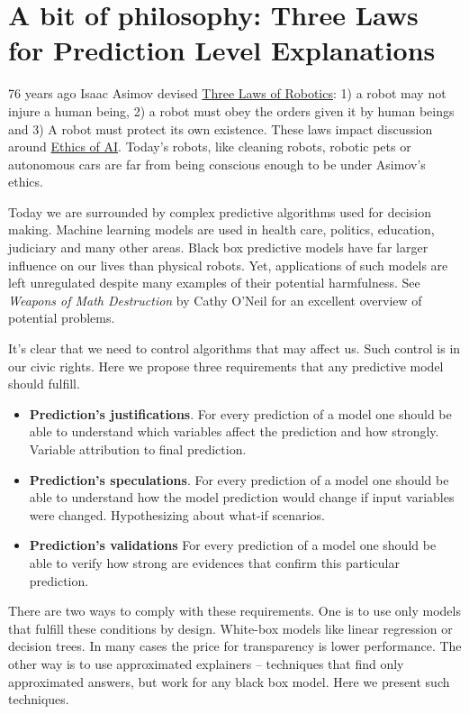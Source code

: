 \documentclass[]{book}
\providecommand{\tightlist}{%
  \setlength{\itemsep}{0pt}\setlength{\parskip}{0pt}}
\theoremstyle{definition}
\theoremstyle{definition}
\theoremstyle{definition}
\theoremstyle{remark}
\begin{document}
\hypertarget{three-single-laws}{%
\section{A bit of philosophy: Three Laws for Prediction Level
Explanations}\label{three-single-laws}}

76 years ago Isaac Asimov devised
\href{https://en.wikipedia.org/wiki/Three_Laws_of_Robotics}{Three Laws
of Robotics}: 1) a robot may not injure a human being, 2) a robot must
obey the orders given it by human beings and 3) A robot must protect its
own existence. These laws impact discussion around
\href{https://en.wikipedia.org/wiki/Ethics_of_artificial_intelligence}{Ethics
of AI}. Today's robots, like cleaning robots, robotic pets or autonomous
cars are far from being conscious enough to be under Asimov's ethics.

Today we are surrounded by complex predictive algorithms used for
decision making. Machine learning models are used in health care,
politics, education, judiciary and many other areas. Black box
predictive models have far larger influence on our lives than physical
robots. Yet, applications of such models are left unregulated despite
many examples of their potential harmfulness. See \emph{Weapons of Math
Destruction} by Cathy O'Neil for an excellent overview of potential
problems.

It's clear that we need to control algorithms that may affect us. Such
control is in our civic rights. Here we propose three requirements that
any predictive model should fulfill.

\begin{itemize}
\tightlist
\item
  \textbf{Prediction's justifications}. For every prediction of a model
  one should be able to understand which variables affect the prediction
  and how strongly. Variable attribution to final prediction.
\item
  \textbf{Prediction's speculations}. For every prediction of a model
  one should be able to understand how the model prediction would change
  if input variables were changed. Hypothesizing about what-if
  scenarios.
\item
  \textbf{Prediction's validations} For every prediction of a model one
  should be able to verify how strong are evidences that confirm this
  particular prediction.
\end{itemize}

There are two ways to comply with these requirements. One is to use only
models that fulfill these conditions by design. White-box models like
linear regression or decision trees. In many cases the price for
transparency is lower performance. The other way is to use approximated
explainers -- techniques that find only approximated answers, but work
for any black box model. Here we present such techniques.
\end{document}
